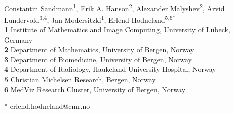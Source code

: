 \documentclass[10pt]{article}
\date{}
\begin{document}
\vspace*{0.2in}

\begin{flushleft}
{\Large
\textbf{} %
}
\newline
\\
Constantin Sandmann\textsuperscript{1},
Erik A. Hanson\textsuperscript{2},
Alexander Malyshev\textsuperscript{2},
Arvid Lundervold\textsuperscript{3,4},
Jan Modersitzki\textsuperscript{1},
Erlend Hodneland\textsuperscript{5,6*}
\\
\bigskip
\textbf{1} Institute of Mathematics and Image Computing, University of L\"ubeck, Germany
\\
\textbf{2} Department of Mathematics, University of Bergen, Norway
\\
\textbf{3} Department of Biomedicine, University of Bergen, Norway
\\
\textbf{4} Department of Radiology, Haukeland University Hospital, Norway
\\
\textbf{5} Christian Michelsen Research, Bergen, Norway
\\
\textbf{6} MedViz Research Cluster, University of Bergen, Norway
\\
\bigskip

% 
%





* erlend.hodneland@cmr.no

\end{flushleft}
\end{document}
